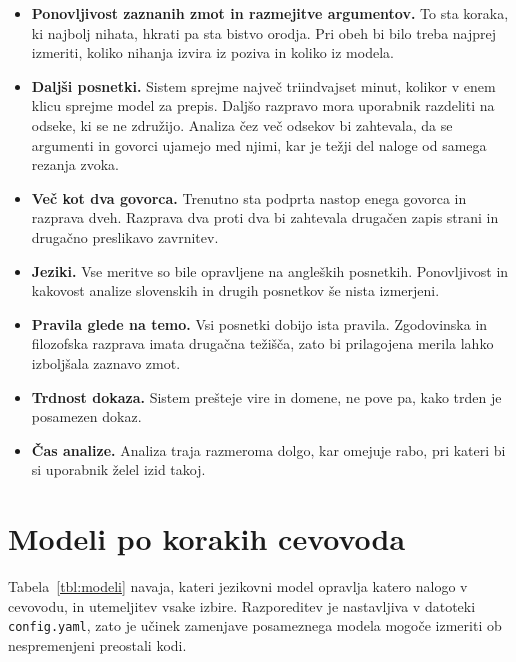 \documentclass[a4paper, 12pt]{book}
\begin{document}
\begin{itemize}
\item \textbf{Ponovljivost zaznanih zmot in razmejitve argumentov.} To sta
      koraka, ki najbolj nihata, hkrati pa sta bistvo orodja. Pri obeh bi bilo
      treba najprej izmeriti, koliko nihanja izvira iz poziva in koliko iz
      modela.
\item \textbf{Daljši posnetki.} Sistem sprejme največ triindvajset minut, kolikor v enem
      klicu sprejme model za prepis. Daljšo razpravo mora uporabnik razdeliti
      na odseke, ki se ne združijo. Analiza čez več odsekov bi zahtevala, da se
      argumenti in govorci ujamejo med njimi, kar je težji del naloge od samega
      rezanja zvoka.
\item \textbf{Več kot dva govorca.} Trenutno sta podprta nastop enega govorca
      in razprava dveh. Razprava dva proti dva bi zahtevala drugačen zapis
      strani in drugačno preslikavo zavrnitev.
\item \textbf{Jeziki.} Vse meritve so bile opravljene na angleških posnetkih.
      Ponovljivost in kakovost analize slovenskih in drugih posnetkov še nista
      izmerjeni.
\item \textbf{Pravila glede na temo.} Vsi posnetki dobijo ista pravila.
      Zgodovinska in filozofska razprava imata drugačna težišča, zato bi
      prilagojena merila lahko izboljšala zaznavo zmot.
\item \textbf{Trdnost dokaza.} Sistem prešteje vire in domene, ne pove pa,
      kako trden je posamezen dokaz.
\item \textbf{Čas analize.} Analiza traja razmeroma dolgo, kar omejuje rabo,
      pri kateri bi si uporabnik želel izid takoj.
\end{itemize}

\cleardoublepage
{}



\appendix

\chapter{Modeli po korakih cevovoda}
\label{app:modeli}

Tabela~\ref{tbl:modeli} navaja, kateri jezikovni model opravlja katero nalogo v
cevovodu, in utemeljitev vsake izbire. Razporeditev je nastavljiva v datoteki
\texttt{config.yaml}, zato je učinek zamenjave posameznega modela mogoče
izmeriti ob nespremenjeni preostali kodi.
\end{document}
